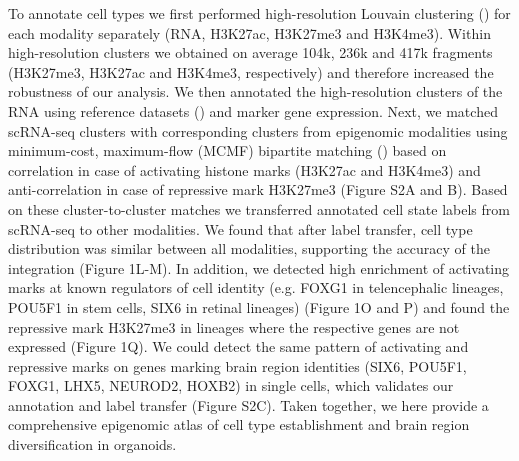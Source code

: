 To annotate cell types we first performed high-resolution Louvain clustering (\cite{blondel_fast_2008}) for each modality separately (RNA, H3K27ac, H3K27me3 and H3K4me3). Within high-resolution clusters we obtained on average 104k, 236k and 417k fragments (H3K27me3, H3K27ac and H3K4me3, respectively) and therefore increased the robustness of our analysis. We then annotated the high-resolution clusters of the RNA using reference datasets (\cite{kanton_organoid_2019,fleck_inferring_2021}) and marker gene expression. Next, we matched scRNA-seq clusters with corresponding clusters from epigenomic modalities using minimum-cost, maximum-flow (MCMF) bipartite matching (\cite{stark_scim_2020}) based on correlation in case of activating histone marks (H3K27ac and H3K4me3) and anti-correlation in case of repressive mark H3K27me3 (Figure S2A and B). Based on these cluster-to-cluster matches we transferred annotated cell state labels from scRNA-seq to other modalities. We found that after label transfer, cell type distribution was similar between all modalities, supporting the accuracy of the integration (Figure 1L-M). In addition, we detected high enrichment of activating marks at known regulators of cell identity (e.g. FOXG1 in telencephalic lineages, POU5F1 in stem cells, SIX6 in retinal lineages) (Figure 1O and P) and found the repressive mark H3K27me3 in lineages where the respective genes are not expressed (Figure 1Q). We could detect the same pattern of activating and repressive marks on genes marking brain region identities (SIX6, POU5F1, FOXG1, LHX5, NEUROD2, HOXB2) in single cells, which validates our annotation and label transfer (Figure S2C). Taken together, we here provide a comprehensive epigenomic atlas of cell type establishment and brain region diversification in organoids.

